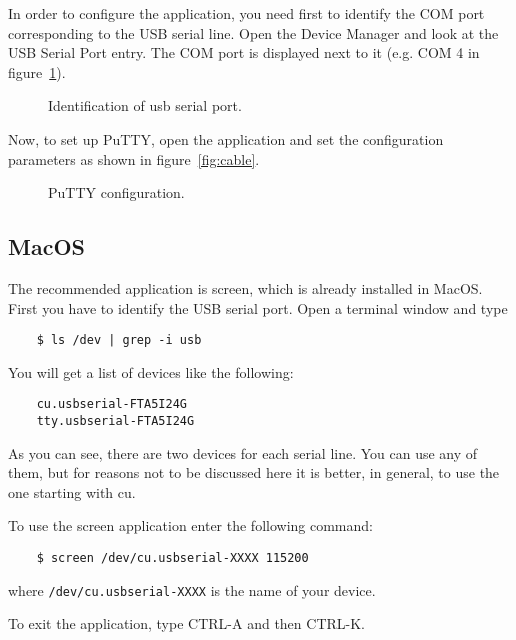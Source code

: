 In order to configure the application, you need first to identify the COM port corresponding to the USB serial line. Open the Device Manager and look at the USB Serial Port entry. The COM port is displayed next to it (e.g. COM 4 in figure~\ref{fig:com}).

\begin{figure}[hbtp!]
            \caption{Identification of usb serial port.}
            \label{fig:com}
\end{figure}

Now, to set up PuTTY, open the application and set the configuration parameters as shown in figure~\ref{fig:cable}.

\begin{figure}[hbtp!]
            \caption{PuTTY configuration.}
            \label{fig:putty}
\end{figure}

\subsection{MacOS}
The recommended application is screen, which is already installed in MacOS.
First you have to identify the USB serial port. Open a terminal window and type

\begin{BVerbatim}
	$ ls /dev | grep -i usb
\end{BVerbatim}

You will get a list of devices like the following:

\begin{BVerbatim}
	cu.usbserial-FTA5I24G
	tty.usbserial-FTA5I24G
\end{BVerbatim}

As you can see, there are two devices for each serial line. You can use any of them, but for reasons not to be discussed here it is better, in general, to use the one starting with cu.

To use the screen application enter the following command:

\begin{BVerbatim}
	$ screen /dev/cu.usbserial-XXXX 115200
\end{BVerbatim}
	
where \texttt{/dev/cu.usbserial-XXXX} is the name of your device.

To exit the application, type CTRL-A and then CTRL-K.

